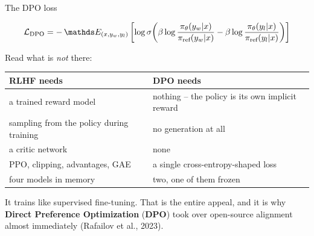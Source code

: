 \documentclass[aspectratio=169]{beamer}
\begin{document}
\begin{frame}{The DPO loss}
  \begin{center}
  \begin{tcolorbox}[colback=armblue!8, colframe=armblue, boxrule=0.9pt, arc=2pt, width=0.97\textwidth]
    \[ \mathcal{L}_{\text{DPO}} = -\,\E_{(x,y_w,y_l)}\left[ \log \sigma\!\left(
       \beta \log \frac{\pi_\theta(y_w|x)}{\pi_{\text{ref}}(y_w|x)}
       - \beta \log \frac{\pi_\theta(y_l|x)}{\pi_{\text{ref}}(y_l|x)} \right)\right] \]
  \end{tcolorbox}
  \end{center}

  \vskip 6pt
  \small
  Read what is \emph{not} there:

  \vskip 4pt
  \begin{center}
  \footnotesize
  \begin{tabular}{l l}
    \toprule
    \textbf{RLHF needs} & \textbf{DPO needs} \\
    \midrule
    a trained reward model & nothing -- the policy is its own implicit reward \\
    sampling from the policy during training & no generation at all \\
    a critic network & none \\
    PPO, clipping, advantages, GAE & a single cross-entropy-shaped loss \\
    four models in memory & two, one of them frozen \\
    \bottomrule
  \end{tabular}
  \end{center}

  \vskip 8pt
  \begin{center}
    \small
    It trains like supervised fine-tuning. That is the entire appeal, and it is why
    \textbf{Direct Preference Optimization} (\textbf{DPO}) took over open-source
    alignment almost immediately (Rafailov et al., 2023).
  \end{center}
\end{frame}
\end{document}
